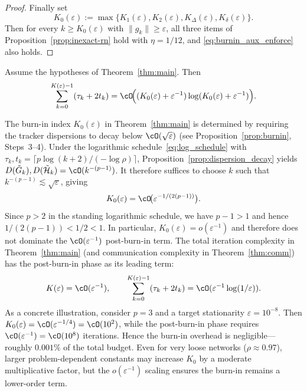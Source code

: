 \documentclass[review,onefignum,onetabnum]{siamart171218}
\begin{document}
\begin{proof}
\smallskip
Finally set
\[
K_0(\varepsilon):=\max\{K_1(\varepsilon),K_2(\varepsilon),K_\Delta(\varepsilon),K_\delta(\varepsilon)\}.
\]
Then for every $k\ge K_0(\varepsilon)$ with $\|g_k\|\ge \varepsilon$, all three items of Proposition~\ref{prop:inexact-rn} hold with $\eta=1/12$,
and \eqref{eq:burnin_aux_enforce} also holds.
\end{proof}

\begin{theorem}\label{thm:comm}
Assume the hypotheses of Theorem~\ref{thm:main}. Then
\[
\sum_{k=0}^{K(\varepsilon)-1}(\tau_k+2t_k)
=\cO\!\Big((K_0(\varepsilon)+\varepsilon^{-1})\log(K_0(\varepsilon)+\varepsilon^{-1})\Big).
\]
\end{theorem}

\begin{remark}\label{rem:burnin_order_app}
The burn-in index $K_0(\varepsilon)$ in Theorem~\ref{thm:main} is
determined by requiring the tracker dispersions to decay below
$\cO(\sqrt\varepsilon)$ (see Proposition~\ref{prop:burnin}, Steps~3--4).
Under the logarithmic schedule~\eqref{eq:log_schedule} with
$\tau_k,t_k=\lceil p\log(k+2)/(-\log\rho)\rceil$,
Proposition~\ref{prop:dispersion_decay} yields
$D(\tilde G_k),D(\tilde{\mathcal H}_k)=\cO(k^{-(p-1)})$.
It therefore suffices to choose $k$ such that $k^{-(p-1)}\lesssim\sqrt\varepsilon$,
giving
\[
K_0(\varepsilon)=\cO\!\big(\varepsilon^{-1/(2(p-1))}\big).
\]
Since $p>2$ in the standing logarithmic schedule, we have $p-1>1$
and hence $1/(2(p-1))<1/2<1$.
In particular, $K_0(\varepsilon)=o(\varepsilon^{-1})$ and therefore
does not dominate the $\cO(\varepsilon^{-1})$ post-burn-in term.
The total iteration complexity in Theorem~\ref{thm:main}
(and communication complexity in Theorem~\ref{thm:comm}) has the
post-burn-in phase as its leading term:
\[
K(\varepsilon)=\cO(\varepsilon^{-1}),
\qquad
\sum_{k=0}^{K(\varepsilon)-1}(\tau_k+2t_k)
=\cO(\varepsilon^{-1}\log(1/\varepsilon)).
\]
As a concrete illustration, consider $p=3$ and a target stationarity
$\varepsilon=10^{-8}$.
Then $K_0(\varepsilon)=\cO(\varepsilon^{-1/4})=\cO(10^{2})$,
while the post-burn-in phase requires $\cO(\varepsilon^{-1})=\cO(10^{8})$
iterations.
Hence the burn-in overhead is negligible---roughly $0.001\%$
of the total budget.
Even for very loose networks ($\rho\approx0.97$), larger
problem-dependent constants may increase $K_0$ by a moderate
multiplicative factor, but the $o(\varepsilon^{-1})$ scaling ensures
the burn-in remains a lower-order term.
\end{remark}
\end{document}
